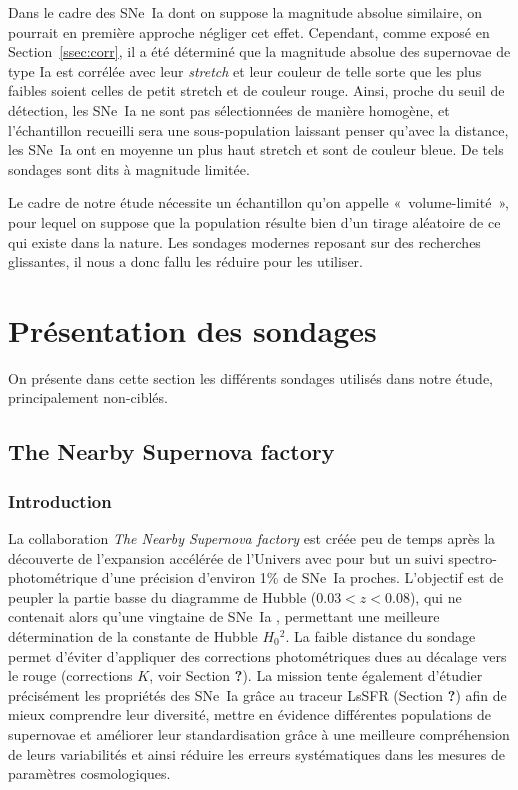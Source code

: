 \documentclass[../main/main.tex]{subfiles}
\begin{document}
Dans le cadre des SNe~Ia dont on suppose la magnitude absolue similaire, on
pourrait en première approche négliger cet effet. Cependant, comme exposé en
Section~\ref{ssec:corr}, il a été déterminé que la magnitude absolue des
supernovae de type Ia est corrélée avec leur \textit{stretch} et leur couleur de
telle sorte que les plus faibles soient celles de petit stretch et de couleur
rouge. Ainsi, proche du seuil de détection, les SNe~Ia ne sont pas sélectionnées
de manière homogène, et l'échantillon recueilli sera une sous-population
laissant penser qu'avec la distance, les SNe~Ia ont en moyenne un plus haut
stretch et sont de couleur bleue. De tels sondages sont dits à magnitude
limitée.

Le cadre de notre étude nécessite un échantillon qu'on appelle
«~volume-limité~», pour lequel on suppose que la population résulte bien d'un
tirage aléatoire de ce qui existe dans la nature. Les sondages modernes reposant
sur des recherches glissantes, il nous a donc fallu les réduire pour les
utiliser.

\section{Présentation des sondages}\label{sec:surveys}
On présente dans cette section les différents sondages utilisés dans notre
étude, principalement non-ciblés.

\subsection{The Nearby Supernova factory}\label{ssec:snf}
\subsubsection{Introduction}\label{sssec:snfintro}

La collaboration \textit{The Nearby Supernova factory}
\citep[SNfactory,][]{aldering2002} est créée peu de temps après la découverte de
l'expansion accélérée de l'Univers \citep{riess1998, perlmutter1999} avec pour
but un suivi spectro-photométrique d'une précision d'environ 1\% de SNe~Ia
proches. L'objectif est de peupler la partie basse du diagramme de Hubble ($0.03
< z < 0.08$), qui ne contenait alors qu'une vingtaine de SNe~Ia
\citep{hamuy1996}, permettant une meilleure détermination de la constante de
Hubble $H_0{}^2$. La faible distance du sondage permet d'éviter d'appliquer des
corrections photométriques dues au décalage vers le rouge (corrections $K$, voir
Section \textbf{?}). La mission tente également d'étudier précisément les
propriétés des SNe~Ia grâce au traceur LsSFR (Section \textbf{?}) afin de mieux
comprendre leur diversité, mettre en évidence différentes populations de
supernovae et améliorer leur standardisation grâce à une meilleure compréhension
de leurs variabilités et ainsi réduire les erreurs systématiques dans les
mesures de paramètres cosmologiques.
\end{document}

